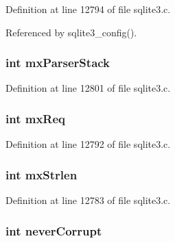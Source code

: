 Definition at line 12794 of file sqlite3.\+c.



Referenced by sqlite3\+\_\+config().

\hypertarget{struct_sqlite3_config_aec08e91dd93acd0b206d1a672ea703f5}{}
\subsubsection[{mx\+Parser\+Stack}]{\setlength{\rightskip}{0pt plus 5cm}int mx\+Parser\+Stack}\label{struct_sqlite3_config_aec08e91dd93acd0b206d1a672ea703f5}


Definition at line 12801 of file sqlite3.\+c.

\hypertarget{struct_sqlite3_config_ade278f37a74995898e7aeac99d97c9aa}{}
\subsubsection[{mx\+Req}]{\setlength{\rightskip}{0pt plus 5cm}int mx\+Req}\label{struct_sqlite3_config_ade278f37a74995898e7aeac99d97c9aa}


Definition at line 12792 of file sqlite3.\+c.

\hypertarget{struct_sqlite3_config_a0faee16932dbed888694e892b8230c6d}{}
\subsubsection[{mx\+Strlen}]{\setlength{\rightskip}{0pt plus 5cm}int mx\+Strlen}\label{struct_sqlite3_config_a0faee16932dbed888694e892b8230c6d}


Definition at line 12783 of file sqlite3.\+c.

\hypertarget{struct_sqlite3_config_a05b2ce44944a6e771f6c75bb32db984b}{}
\subsubsection[{never\+Corrupt}]{\setlength{\rightskip}{0pt plus 5cm}int never\+Corrupt}\label{struct_sqlite3_config_a05b2ce44944a6e771f6c75bb32db984b}



